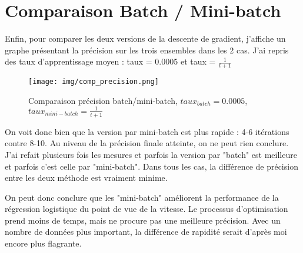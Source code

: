 \documentclass[12pt]{article}
\begin{document}
\section{Comparaison Batch / Mini-batch}
Enfin, pour comparer les deux versions de la descente de gradient, j'affiche un graphe présentant la précision sur les trois ensembles dans les 2 cas. J'ai repris des taux d'apprentissage moyen : taux = 0.0005 et taux = $\frac{1}{t+1}$

\begin{figure}[H]
\begin{center}
	\texttt{[image: img/comp\_precision.png]}
	\caption{Comparaison précision batch/mini-batch, $taux_{batch} = 0.0005$, $taux_{mini-batch} = \frac{1}{t+1}$}
\end{center}
\end{figure}
On voit donc bien que la version par mini-batch est plus rapide : 4-6 itérations contre 8-10.
Au niveau de la précision finale atteinte, on ne peut rien conclure. J'ai refait plusieurs fois les mesures et parfois la version par "batch" est meilleure et parfois c'est celle par "mini-batch". Dans tous les cas, la différence de précision entre les deux méthode est vraiment minime. 


On peut donc conclure que les "mini-batch" améliorent la performance de la régression logistique du point de vue de la vitesse. Le processus d'optimisation prend moins de temps, mais ne procure pas une meilleure précision. Avec un nombre de données plus important, la différence de rapidité serait d'après moi encore plus flagrante.
\end{document}
